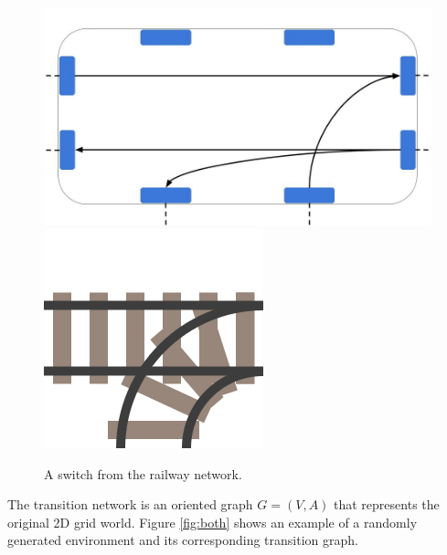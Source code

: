 \documentclass[14pt,a4paper]{article}
\theoremstyle{definition}
\numberwithin{equation}{subsection}
\begin{document}
\begin{figure}[h]
	\begin{minipage}{0.5\linewidth}
	\centering
	\includegraphics[width=0.9\linewidth]{img/super_node.jpg}
	\caption{Super node representing the cell represented in Figure \ref{fig:cell super node example}. The blue rectangles represent the internal nodes of the cell, where the big white rectangle represents the super node.}
	\label{fig:simple_super_node}
	\end{minipage}
	\begin{minipage}{0.5\linewidth}
	\centering
	\includegraphics[width=0.5\linewidth]{img/switch.png}
	\caption{A switch from the railway network.}
	\vspace{1.6cm}
	\label{fig:cell super node example}
	\end{minipage}
\end{figure}

The transition network is an oriented graph $G = (V,A)$ that represents the original 2D grid world. Figure \ref{fig:both} shows an example of a randomly generated environment and its corresponding transition graph.
\end{document}
